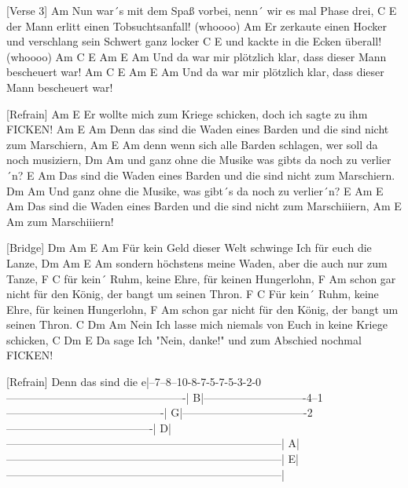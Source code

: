 [Verse 3]
Am
Nun war´s mit dem Spaß vorbei,
nenn´ wir es mal Phase drei,
    C                            E
der Mann erlitt einen Tobsuchtsanfall! (whoooo)
Am
Er zerkaute einen Hocker
und verschlang sein Schwert ganz locker
    C                       E
und kackte in die Ecken überall! (whoooo)
Am             C                    E             Am   E   Am
Und da war mir plötzlich klar, dass dieser Mann bescheuert war!
Am             C                    E             Am   E   Am
Und da war mir plötzlich klar, dass dieser Mann bescheuert war!

[Refrain]
Am                                                        E
Er wollte mich zum Kriege schicken, doch ich sagte zu ihm FICKEN!
                  Am          E                                Am
Denn das sind die Waden eines Barden und die sind nicht zum Marschiern,
               Am          E                              Am
denn wenn sich alle Barden schlagen, wer soll da noch musiziern,
         Dm                        Am
und ganz ohne die Musike was gibts da noch zu verlier´n?
             E                                            Am
Das sind die Waden eines Barden und die sind nicht zum Marschiern.
         Dm                          Am
Und ganz ohne die Musike, was gibt´s da noch zu verlier´n?
             E                                            Am  E Am
Das sind die Waden eines Barden und die sind nicht zum Marschiiiern,
       Am  E Am
zum Marschiiiern!

[Bridge]
         Dm          Am            E                Am
Für kein Geld dieser Welt schwinge Ich für euch die Lanze,
        Dm              Am          E                Am
sondern höchstens meine Waden, aber die auch nur zum Tanze,
          F                     C
für kein´ Ruhm, keine Ehre, für keinen Hungerlohn,
      F                            Am
schon gar nicht für den König, der bangt um seinen Thron.
          F                     C
Für kein´ Ruhm, keine Ehre, für keinen Hungerlohn,
      F                            Am
schon gar nicht für den König, der bangt um seinen Thron.
         C             Dm                            Am
Nein Ich lasse mich niemals von Euch in keine Kriege schicken,
   C               Dm                               E
Da sage Ich "Nein, danke!" und zum Abschied nochmal FICKEN!

[Refrain]
                         Denn
                            das sind
                                   die
e|--7--8--10-8-7-5-7-5-3-2-0-------------------------------------------------|
B|----------------------------4--1-------------------------------------------|
G|----------------------------------2----------------------------------------|
D|---------------------------------------------------------------------------|
A|---------------------------------------------------------------------------|
E|---------------------------------------------------------------------------|

